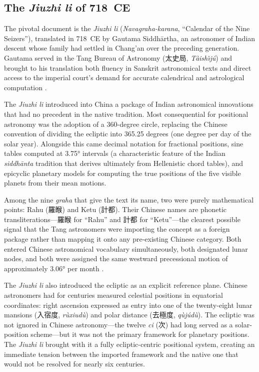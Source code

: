 \documentclass[10pt,a4paper]{article}
\newcommand{\zh}[1]{#1}
\begin{document}
\subsection*{The \textit{Jiuzhi li} of 718~CE}

The pivotal document is the \textit{Jiuzhi li}
(\textit{Navagraha-karana}, ``Calendar of the Nine Seizers''), translated
in 718~CE by Gautama Siddh\=artha, an astronomer of
Indian descent whose family had settled in Chang'an over the preceding
generation.  Gautama served in the Tang Bureau of Astronomy
(\zh{太史局}, \textit{T\`aish\v{\i}j\'u}) and brought to his translation both fluency in Sanskrit
astronomical texts and direct access to the imperial court's demand for
accurate calendrical and astrological computation
\cite{yabuuchi1989sui,kotyk2018sinicization}.

The \textit{Jiuzhi li} introduced into China a package of Indian
astronomical innovations that had no precedent in the native tradition.
Most consequential for positional astronomy was the adoption of a
360-degree circle, replacing the Chinese convention of dividing the
ecliptic into 365.25 degrees (one degree per day of the solar year).
Alongside this came decimal notation for fractional positions, sine
tables computed at 3.75° intervals (a characteristic feature of the
Indian \textit{siddh\=anta} tradition that derives ultimately from
Hellenistic chord tables), and epicyclic planetary models for computing
the true positions of the five visible planets from their mean motions.

Among the nine \textit{graha} that give the text its name, two were
purely mathematical points: Rahu (\zh{羅睺}) and Ketu (\zh{計都}).
Their Chinese names are phonetic transliterations---\zh{羅睺} for
``Rahu'' and \zh{計都} for ``Ketu''---the clearest possible signal that
the Tang astronomers were importing the concept as a foreign package
rather than mapping it onto any pre-existing Chinese category.  Both
entered Chinese astronomical vocabulary simultaneously, both designated
lunar nodes, and both were assigned the same westward precessional
motion of approximately 3.06° per month
\cite{yabuuchi1989sui,kotyk2018sinicization}.

The \textit{Jiuzhi li} also introduced the ecliptic as an explicit
reference plane.  Chinese astronomers had for centuries measured
celestial positions in equatorial coordinates: right ascension expressed
as entry into one of the twenty-eight lunar mansions (\zh{入宿度},
\textit{r\`uxiud\`u}) and polar distance (\zh{去極度}, \textit{q\`uj\'ud\`u}).
The ecliptic was not ignored in Chinese astronomy---the twelve
\textit{ci} (\zh{次}) had long served as a solar-position scheme---but
it was not the primary framework for planetary positions.  The
\textit{Jiuzhi li} brought with it a fully ecliptic-centric positional
system, creating an immediate tension between the imported framework and
the native one that would not be resolved for nearly six centuries.
\end{document}
